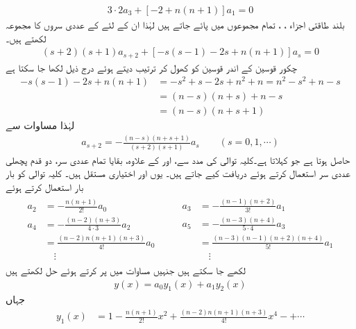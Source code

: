 \begin{align}\label{مساوات_بیسل_لیژانڈر_ت}
3\cdot 2 a_3+[-2+n(n+1)]a_1=0
\end{align}
بلند طاقتی اجزاء ، ،  تمام مجموعوں میں پائے جاتے ہیں لہٰذا ان کے لئے  کے عددی سروں کا مجموعہ لکھتے ہیں۔
\begin{align}\label{مساوات_بیسل_لیژانڈر_ٹ}
(s+2)(s+1)a_{s+2}+[-s(s-1)-2s+n(n+1)]a_s=0
\end{align} 
چکور قوسین  کے اندر قوسین کو کھول کر ترتیب دیتے ہوئے درج ذیل لکھا جا سکتا ہے
\begin{align*}
-s(s-1)-2s+n(n+1)&=-s^2+s-2s+n^2+n=n^2-s^2+n-s\\
&=(n-s)(n+s)+n-s\\
&=(n-s)(n+s+1)
\end{align*}
لہٰذا مساوات  سے 
\begin{align}\label{مساوات_بیسل_کلیہ_توالی_الف}
a_{s+2}=-\frac{(n-s)(n+s+1)}{(s+2)(s+1)}a_s \quad \quad (s=0,1,\cdots)
\end{align}
حاصل ہوتا ہے جو  کہلاتا ہے۔کلیہ توالی کی مدد سے،  اور  کے علاوہ،  بقایا تمام عددی سر، دو قدم پچھلی عددی سر استعمال کرتے ہوئے دریافت کیے جاتے ہیں۔ یوں  اور   اختیاری مستقل ہیں۔ کلیہ توالی کو بار بار استعمال کرتے ہوئے
\begin{gather*}
\begin{aligned}
a_2&=-\frac{n(n+1)}{2!}a_0\\
a_4&=-\frac{(n-2)(n+3)}{4\cdot 3}a_2\\
&=\frac{(n-2)n(n+1)(n+3)}{4!}a_0\\
&\quad\vdots
\end{aligned}\quad\quad
\begin{aligned}
a_3&=-\frac{(n-1)(n+2)}{3!}a_1\\
a_5&=-\frac{(n-3)(n+4)}{5\cdot 4}a_3\\
&=\frac{(n-3)(n-1)(n+2)(n+4)}{5!}a_1\\
&\quad \vdots
\end{aligned}
\end{gather*}
لکھے جا سکتے ہیں جنہیں مساوات  میں پر کرتے ہوئے حل لکھتے ہیں
\begin{align}\label{مساوات_بیسل_حل_لیژانڈر}
y(x)=a_0y_1(x)+a_1y_2(x)
\end{align}
جہاں
\begin{align}\label{مساوات_بیسل_حل_لیژانڈر_الف}
y_1(x)&=1-\frac{n(n+1)}{2!}x^2+\frac{(n-2)n(n+1)(n+3)}{4!}x^4-+\cdots
\end{align}
